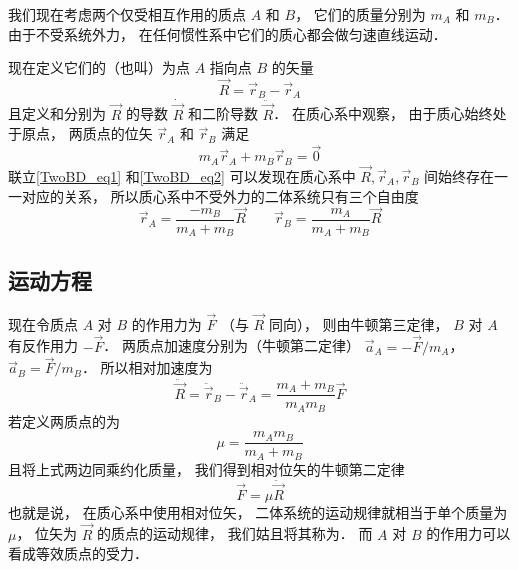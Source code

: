

我们现在考虑两个仅受相互作用的质点 $A$ 和 $B$， 它们的质量分别为 $m_A$ 和 $m_B$． 由于不受系统外力， 在任何惯性系中它们的质心都会做匀速直线运动．%

现在定义它们的（也叫）为点 $A$ 指向点 $B$ 的矢量
\begin{equation}\label{TwoBD_eq1}
\vec R = \vec r_B - \vec r_A
\end{equation}
且定义和分别为 $\vec R$ 的导数 $\dot{\vec R}$ 和二阶导数 $\ddot{\vec R}$．
在质心系中观察， 由于质心始终处于原点， 两质点的位矢 $\vec r_A$ 和 $\vec r_B$ 满足
\begin{equation}\label{TwoBD_eq2}
m_A \vec r_A + m_B \vec r_B = \vec 0
\end{equation}
联立\autoref{TwoBD_eq1} 和\autoref{TwoBD_eq2} 可以发现在质心系中 $\vec R, \vec r_A, \vec r_B$ 间始终存在一一对应的关系， 所以质心系中不受外力的二体系统只有三个自由度
\begin{equation}\label{TwoBD_eq3}
\vec r_A = \frac{-m_B}{m_A + m_B} \vec R \qquad \vec r_B = \frac{m_A}{m_A + m_B} \vec R
\end{equation}

\subsection{运动方程}

现在令质点 $A$ 对 $B$ 的作用力为 $\vec F$ （与 $\vec R$ 同向）， 则由牛顿第三定律， $B$ 对 $A$ 有反作用力 $- \vec F$． 两质点加速度分别为（牛顿第二定律） $\vec a_A =  -\vec F/m_A$， $\vec a_B =  \vec F/m_B$． 所以相对加速度为
\begin{equation}
\ddot{\vec R} = \ddot{\vec r}_B - \ddot{\vec r}_A = \frac{m_A+m_B}{m_Am_B} \vec F
\end{equation}
若定义两质点的为
\begin{equation}
\mu = \frac{m_A m_B}{m_A + m_B}
\end{equation}
且将上式两边同乘约化质量， 我们得到相对位矢的牛顿第二定律
\begin{equation}\label{TwoBD_eq6}
\vec F = \mu\ddot{\vec R}
\end{equation}
也就是说， 在质心系中使用相对位矢， 二体系统的运动规律就相当于单个质量为 $\mu$， 位矢为 $\vec R$ 的质点的运动规律， 我们姑且将其称为． 而 $A$ 对 $B$ 的作用力可以看成等效质点的受力．

